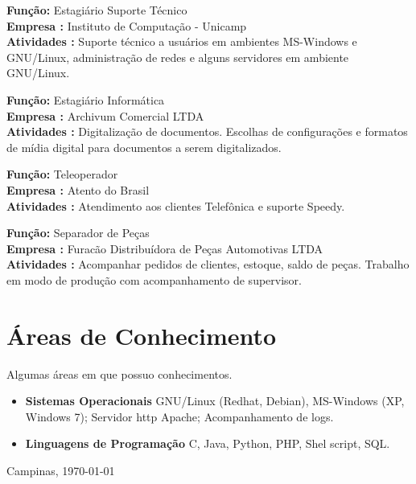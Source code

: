 \documentclass[a4paper]{article}
\begin{document}
\begin{CV}

\item[Desde 07/2010] \textbf{Função:} Estagiário Suporte Técnico
\\ \textbf{Empresa :} Instituto de Computação - Unicamp
\\ \textbf{Atividades :} Suporte técnico a usuários em ambientes MS-Windows e GNU/Linux, administração de redes e alguns  
servidores em ambiente GNU/Linux.

\item[01/2010--06/2010] \textbf{Função:} Estagiário Informática
\\ \textbf{Empresa :} Archivum Comercial LTDA
\\ \textbf{Atividades :} Digitalização de documentos. Escolhas de configurações e formatos de mídia digital para documentos a serem digitalizados.

\item[05/2007--07/2009] \textbf{Função:} Teleoperador
\\ \textbf{Empresa :} Atento do Brasil
\\ \textbf{Atividades :} Atendimento aos clientes Telefônica e suporte Speedy.

\item[09/2004--12/2006] \textbf{Função:} Separador de Peças
\\ \textbf{Empresa :} Furacão Distribuídora de Peças Automotivas LTDA
\\ \textbf{Atividades :} Acompanhar pedidos de clientes, estoque, saldo de peças. Trabalho em modo de produção com acompanhamento de supervisor.

\end{CV}

\section{Áreas de Conhecimento}
Algumas áreas em que possuo conhecimentos.
\begin{itemize}
	\item \textbf{Sistemas Operacionais} GNU/Linux (Redhat, Debian), MS-Windows (XP, Windows 7); Servidor http Apache; Acompanhamento de logs.
	\item \textbf{Linguagens de Programação} C, Java, Python, PHP, Shel script, SQL.
\end{itemize}
\vspace{2\baselineskip}
\noindent Campinas, \today
\end{document}
